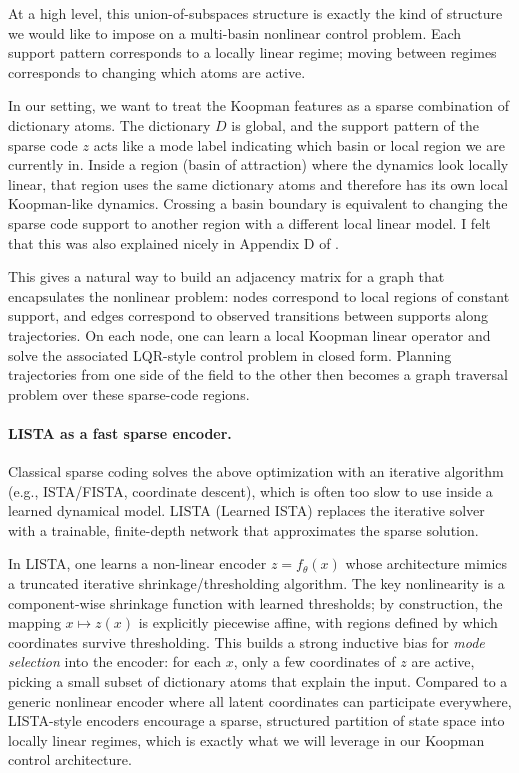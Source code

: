 At a high level, this union-of-subspaces structure is exactly the kind of structure we would like to impose on a multi-basin nonlinear control problem.
Each support pattern corresponds to a locally linear regime; moving between regimes corresponds to changing which atoms are active.

In our setting, we want to treat the Koopman features as a sparse combination of dictionary atoms.
The dictionary $D$ is global, and the support pattern of the sparse code $z$ acts like a mode label indicating which basin or local region we are currently in.
Inside a region (basin of attraction) where the dynamics look locally linear, that region uses the same dictionary atoms and therefore has its own local Koopman-like dynamics.
Crossing a basin boundary is equivalent to changing the sparse code support to another region with a different local linear model. I felt that this was also explained nicely in Appendix D of \citet{fathi_course_2023}.

This gives a natural way to build an adjacency matrix for a graph that encapsulates the nonlinear problem: nodes correspond to local regions of constant support, and edges correspond to observed transitions between supports along trajectories.
On each node, one can learn a local Koopman linear operator and solve the associated LQR-style control problem in closed form.
Planning trajectories from one side of the field to the other then becomes a graph traversal problem over these sparse-code regions.

\paragraph{LISTA as a fast sparse encoder.}
Classical sparse coding solves the above optimization with an iterative algorithm (e.g., ISTA/FISTA, coordinate descent), which is often too slow to use inside a learned dynamical model.
LISTA (Learned ISTA) \citep{gregor_learning_2010} replaces the iterative solver with a trainable, finite-depth network that approximates the sparse solution.

In LISTA, one learns a non-linear encoder $z = f_\theta(x)$ whose architecture mimics a truncated iterative shrinkage/thresholding algorithm.
The key nonlinearity is a component-wise shrinkage function with learned thresholds; by construction, the mapping $x \mapsto z(x)$ is explicitly piecewise affine, with regions defined by which coordinates survive thresholding.
This builds a strong inductive bias for \emph{mode selection} into the encoder: for each $x$, only a few coordinates of $z$ are active, picking a small subset of dictionary atoms that explain the input.
Compared to a generic nonlinear encoder where all latent coordinates can participate everywhere, LISTA-style encoders encourage a sparse, structured partition of state space into locally linear regimes, which is exactly what we will leverage in our Koopman control architecture.


